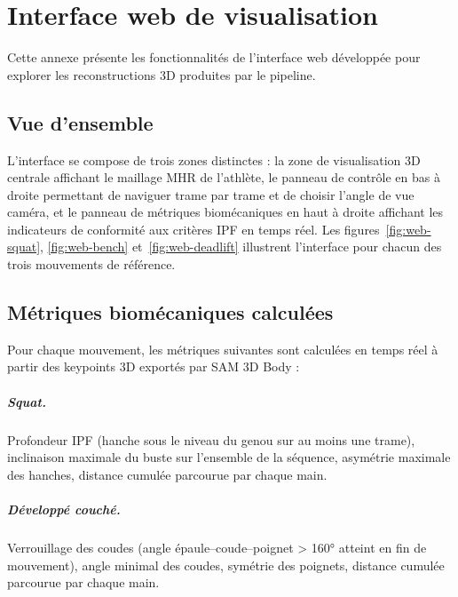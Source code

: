 \chapter{Interface web de visualisation} \label{ann:web-interface}

Cette annexe présente les fonctionnalités de l'interface web
développée pour explorer les reconstructions 3D produites par
le pipeline.

\section*{Vue d'ensemble}

L'interface se compose de trois zones distinctes : la zone de visualisation 3D centrale affichant le maillage MHR de l'athlète, le panneau de contrôle en bas à droite permettant de naviguer trame par trame et de choisir l'angle de vue caméra, et le panneau de métriques biomécaniques en haut à droite affichant les indicateurs de conformité aux critères IPF en temps réel. Les figures~\ref{fig:web-squat}, \ref{fig:web-bench} et~\ref{fig:web-deadlift} illustrent l'interface pour chacun des trois mouvements de référence.

\section*{Métriques biomécaniques calculées}

Pour chaque mouvement, les métriques suivantes sont calculées en temps réel à partir des keypoints 3D exportés par SAM 3D Body :

\paragraph{Squat.}
Profondeur IPF (hanche sous le niveau du genou sur au moins une trame), inclinaison maximale du buste sur l'ensemble de la séquence, asymétrie maximale des hanches, distance cumulée parcourue par chaque main.

\paragraph{Développé couché.}
Verrouillage des coudes (angle épaule--coude--poignet > 160° atteint en fin de mouvement), angle minimal des coudes, symétrie des poignets, distance cumulée parcourue par chaque main.


